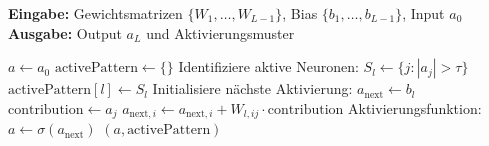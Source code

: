 \documentclass[a4paper,12pt]{report}
\theoremstyle{definition}
\begin{document}
	\begin{algorithm}[H]
		\caption{Sparse Forward-Propagation mit Aktivierungs-Tracking}
		\label{alg:sparse-forward-detailed}
		\textbf{Eingabe:} Gewichtsmatrizen $\{W_1, \ldots, W_{L-1}\}$, Bias $\{b_1, \ldots, b_{L-1}\}$, Input $a_0$ \\
		\textbf{Ausgabe:} Output $a_L$ und Aktivierungsmuster
		\begin{algorithmic}[1]
			\State $a \gets a_0$
			\State $\text{activePattern} \gets \{\}$ 
			\State Identifiziere aktive Neuronen: $S_l \gets \{j : |a_j| > \tau\}$
			\State $\text{activePattern}[l] \gets S_l$
			\State Initialisiere nächste Aktivierung: $a_{\text{next}} \gets b_l$ 
			 
			\State $\text{contribution} \gets a_j$
			 
			\State $a_{\text{next},i} \gets a_{\text{next},i} + W_{l,ij} \cdot \text{contribution}$
			\EndFor
			\EndFor
			\State Aktivierungsfunktion: $a \gets \sigma(a_{\text{next}})$
			\EndFor
			\State \Return $(a, \text{activePattern})$
		\end{algorithmic}
	\end{algorithm}
\end{document}
